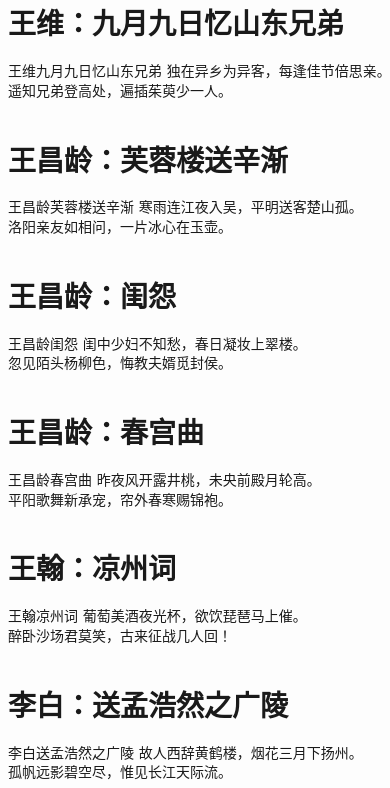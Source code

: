 \documentclass[12pt,oneside,a5paper]{book}
\begin{document}
\chapter{王维：九月九日忆山东兄弟}
\begin{poemzh}{王维}{九月九日忆山东兄弟}
独在异乡为异客，每逢佳节倍思亲。\\
遥知兄弟登高处，遍插茱萸少一人。\\ 
\end{poemzh}

\chapter{王昌龄：芙蓉楼送辛渐}
\begin{poemzh}{王昌龄}{芙蓉楼送辛渐}
寒雨连江夜入吴，平明送客楚山孤。\\
洛阳亲友如相问，一片冰心在玉壶。\\ 
\end{poemzh}

\chapter{王昌龄：闺怨}
\begin{poemzh}{王昌龄}{闺怨}
闺中少妇不知愁，春日凝妆上翠楼。\\
忽见陌头杨柳色，悔教夫婿觅封侯。\\ 
\end{poemzh}

\chapter{王昌龄：春宫曲}
\begin{poemzh}{王昌龄}{春宫曲}
昨夜风开露井桃，未央前殿月轮高。\\
平阳歌舞新承宠，帘外春寒赐锦袍。\\ 
\end{poemzh}

\chapter{王翰：凉州词}
\begin{poemzh}{王翰}{凉州词}
葡萄美酒夜光杯，欲饮琵琶马上催。\\
醉卧沙场君莫笑，古来征战几人回！\\ 
\end{poemzh}

\chapter{李白：送孟浩然之广陵}
\begin{poemzh}{李白}{送孟浩然之广陵}
故人西辞黄鹤楼，烟花三月下扬州。\\
孤帆远影碧空尽，惟见长江天际流。\\ 
\end{poemzh}
\end{document}
